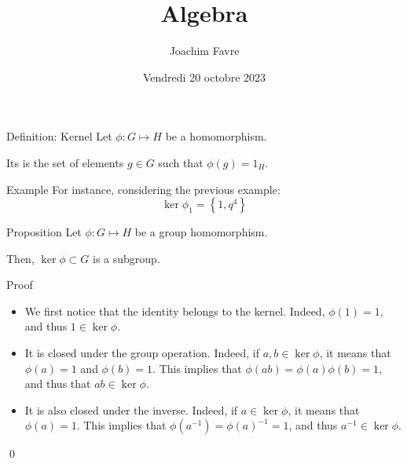 \documentclass[a4paper]{article}
\title{Algebra}
\author{Joachim Favre}
\date{Vendredi 20 octobre 2023}
\begin{document}
\maketitle



\begin{parag}{Definition: Kernel}
    Let $\phi: G \mapsto H$ be a homomorphism.

    Its  is the set of elements $g \in G$ such that $\phi\left(g\right) = 1_H$.

    \begin{subparag}{Example}
        For instance, considering the previous example: 
        \[\ker \phi_1 = \left\{1, q^4\right\}\]
    \end{subparag}
\end{parag}

\begin{parag}{Proposition}
    Let $\phi: G \mapsto H$ be a group homomorphism.

    Then, $\ker \phi \subset G$ is a subgroup.

    \begin{subparag}{Proof}
        \begin{itemize}[left=0pt]
            \item We first notice that the identity belongs to the kernel. Indeed, $\phi\left(1\right) = 1$, and thus $1 \in \ker \phi$.
            \item It is closed under the group operation. Indeed, if $a, b \in \ker \phi$, it means that $\phi\left(a\right) = 1$ and $\phi\left(b\right) = 1$. This implies that $\phi\left(ab\right) = \phi\left(a\right)\phi\left(b\right) = 1$, and thus that $ab \in \ker \phi$.
            \item It is also closed under the inverse. Indeed, if $a \in \ker \phi$, it means that $\phi\left(a\right) = 1$. This implies that $\phi\left(a^{-1}\right) = \phi\left(a\right)^{-1} = 1$, and thus $a^{-1} \in \ker \phi$.
        \end{itemize}
        \qed
    \end{subparag}
\end{parag}
\end{document}
